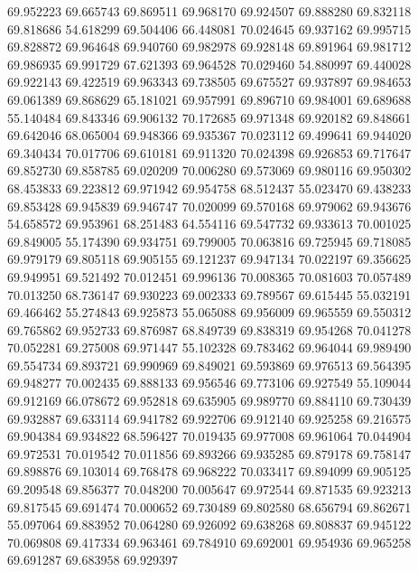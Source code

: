 69.952223
69.665743
69.869511
69.968170
69.924507
69.888280
69.832118
69.818686
54.618299
69.504406
66.448081
70.024645
69.937162
69.995715
69.828872
69.964648
69.940760
69.982978
69.928148
69.891964
69.981712
69.986935
69.991729
67.621393
69.964528
70.029460
54.880997
69.440028
69.922143
69.422519
69.963343
69.738505
69.675527
69.937897
69.984653
69.061389
69.868629
65.181021
69.957991
69.896710
69.984001
69.689688
55.140484
69.843346
69.906132
70.172685
69.971348
69.920182
69.848661
69.642046
68.065004
69.948366
69.935367
70.023112
69.499641
69.944020
69.340434
70.017706
69.610181
69.911320
70.024398
69.926853
69.717647
69.852730
69.858785
69.020209
70.006280
69.573069
69.980116
69.950302
68.453833
69.223812
69.971942
69.954758
68.512437
55.023470
69.438233
69.853428
69.945839
69.946747
70.020099
69.570168
69.979062
69.943676
54.658572
69.953961
68.251483
64.554116
69.547732
69.933613
70.001025
69.849005
55.174390
69.934751
69.799005
70.063816
69.725945
69.718085
69.979179
69.805118
69.905155
69.121237
69.947134
70.022197
69.356625
69.949951
69.521492
70.012451
69.996136
70.008365
70.081603
70.057489
70.013250
68.736147
69.930223
69.002333
69.789567
69.615445
55.032191
69.466462
55.274843
69.925873
55.065088
69.956009
69.965559
69.550312
69.765862
69.952733
69.876987
68.849739
69.838319
69.954268
70.041278
70.052281
69.275008
69.971447
55.102328
69.783462
69.964044
69.989490
69.554734
69.893721
69.990969
69.849021
69.593869
69.976513
69.564395
69.948277
70.002435
69.888133
69.956546
69.773106
69.927549
55.109044
69.912169
66.078672
69.952818
69.635905
69.989770
69.884110
69.730439
69.932887
69.633114
69.941782
69.922706
69.912140
69.925258
69.216575
69.904384
69.934822
68.596427
70.019435
69.977008
69.961064
70.044904
69.972531
70.019542
70.011856
69.893266
69.935285
69.879178
69.758147
69.898876
69.103014
69.768478
69.968222
70.033417
69.894099
69.905125
69.209548
69.856377
70.048200
70.005647
69.972544
69.871535
69.923213
69.817545
69.691474
70.000652
69.730489
69.802580
68.656794
69.862671
55.097064
69.883952
70.064280
69.926092
69.638268
69.808837
69.945122
70.069808
69.417334
69.963461
69.784910
69.692001
69.954936
69.965258
69.691287
69.683958
69.929397

